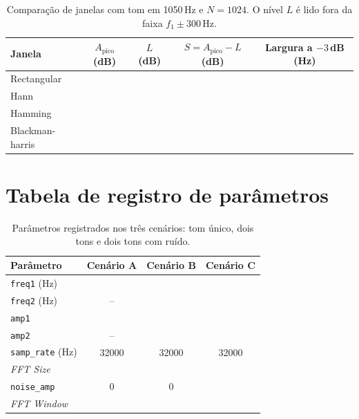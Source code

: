 \documentclass[11pt,a4paper]{article}
\begin{document}
\begin{table}[H]
  \centering
  \begin{tabular}{l c c c c}
    \toprule
    \textbf{Janela} & \textbf{$A_{\mathrm{pico}}$ (dB)} & \textbf{$L$ (dB)} &
      \textbf{$S = A_{\mathrm{pico}} - L$ (dB)} &
      \textbf{Largura a $-3$\,dB (Hz)} \\
    \midrule
    Rectangular      &  &  &  &  \\
    Hann             &  &  &  &  \\
    Hamming          &  &  &  &  \\
    Blackman-harris  &  &  &  &  \\
    \bottomrule
  \end{tabular}
  \caption{Comparação de janelas com tom em 1050\,Hz e $N = 1024$. O nível
    $L$ é lido fora da faixa $f_1 \pm 300$\,Hz.}
  \label{tab:janelas}
\end{table}

\section{Tabela de registro de parâmetros}

\begin{table}[H]
  \centering
  \begin{tabular}{l c c c}
    \toprule
    \textbf{Parâmetro} & \textbf{Cenário A} & \textbf{Cenário B} &
      \textbf{Cenário C} \\
    \midrule
    \texttt{freq1} (Hz)        &  &  &  \\
    \texttt{freq2} (Hz)        & --  &  &  \\
    \texttt{amp1}              &  &  &  \\
    \texttt{amp2}              & --  &  &  \\
    \texttt{samp\_rate} (Hz)   & 32000 & 32000 & 32000 \\
    \textit{FFT Size}          &  &  &  \\
    \texttt{noise\_amp}        & 0 & 0 &  \\
    \textit{FFT Window}        &  &  &  \\
    \bottomrule
  \end{tabular}
  \caption{Parâmetros registrados nos três cenários: tom único, dois tons e
    dois tons com ruído.}
  \label{tab:parametros}
\end{table}

\end{document}
